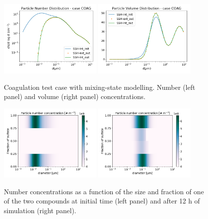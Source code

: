 \documentclass[a4paper,11pt]{article}
\begin{document}
\begin{figure}[H]
        \begin{center}
                \includegraphics[angle=0,width=0.45\textwidth]{../graph/figure_ref/dNdlogd_COAG_EXT.png}
                \includegraphics[angle=0,width=0.45\textwidth]{../graph/figure_ref/dVdlogd_COAG_EXT.png}
        \end{center}
\caption{Coagulation test case with mixing-state modelling. Number (left panel) and volume (right panel) concentrations.}
\label{fig-coag-ext}
\end{figure}
 
\begin{figure}[H]
        \begin{center}
                \includegraphics[angle=0,width=0.45\textwidth]{../graph/figure_ref/coag_ext_init.png}
                \includegraphics[angle=0,width=0.45\textwidth]{../graph/figure_ref/coag_ext_out.png}
        \end{center}
\caption{Number concentrations as a function of the size and fraction of one of the
two compounds at initial time (left panel) and after 12 h of simulation (right panel).}
\label{fig-coag-extb}
\end{figure}
 
\end{document}
